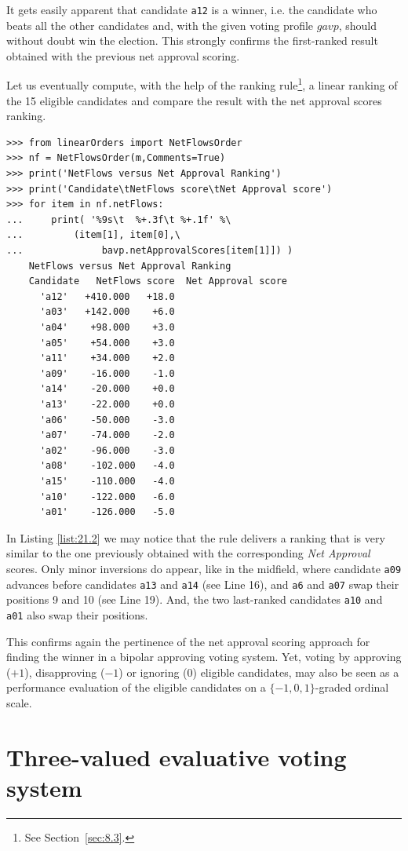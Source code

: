 It gets easily apparent that candidate \texttt{a12} is a \Condorcet winner, i.e. the candidate who beats all the other candidates and, with the given voting profile $gavp$, should without doubt win the election. This strongly confirms the first-ranked result obtained with the previous net approval scoring. 

Let us eventually compute, with the help of the \NetFlows ranking rule\footnote{See Section~\ref{sec:8.3}.}, a linear ranking of the 15 eligible candidates and compare the result with the net approval scores ranking.
\begin{lstlisting}[caption={Comparing the net approval and the \NetFlows rankings},label=list:21.2]
>>> from linearOrders import NetFlowsOrder
>>> nf = NetFlowsOrder(m,Comments=True)
>>> print('NetFlows versus Net Approval Ranking')
>>> print('Candidate\tNetFlows score\tNet Approval score')
>>> for item in nf.netFlows:
...     print( '%9s\t  %+.3f\t %+.1f' %\
...	        (item[1], item[0],\
...              bavp.netApprovalScores[item[1]]) ) 
    NetFlows versus Net Approval Ranking
    Candidate	NetFlows score	Net Approval score
      'a12'	  +410.000	 +18.0
      'a03'	  +142.000	  +6.0
      'a04'	   +98.000	  +3.0
      'a05'	   +54.000	  +3.0
      'a11'	   +34.000	  +2.0
      'a09'	   -16.000	  -1.0
      'a14'	   -20.000	  +0.0
      'a13'	   -22.000	  +0.0
      'a06'	   -50.000	  -3.0
      'a07'	   -74.000	  -2.0
      'a02'	   -96.000	  -3.0
      'a08'	   -102.000	  -4.0
      'a15'	   -110.000	  -4.0
      'a10'	   -122.000	  -6.0
      'a01'	   -126.000	  -5.0
\end{lstlisting}
In Listing \ref{list:21.2} we may notice that the \NetFlows rule delivers a ranking that is very similar to the one previously obtained with the corresponding \emph{Net Approval} scores. Only minor inversions do appear, like in the midfield, where candidate \texttt{a09} advances before candidates \texttt{a13} and \texttt{a14} (see Line 16), and \texttt{a6} and \texttt{a07} swap their positions 9 and 10 (see Line 19). And, the two last-ranked candidates \texttt{a10} and \texttt{a01} also swap their positions.

This confirms again the pertinence of the net approval scoring approach for finding the winner in a bipolar approving voting system. Yet, voting by approving ($+1$), disapproving ($-1$) or ignoring ($0$) eligible candidates, may also be seen as a performance evaluation of the eligible candidates on a $\{-1, 0, 1\}$-graded ordinal scale.

\section{Three-valued evaluative voting system}
\label{sec:21.2}

